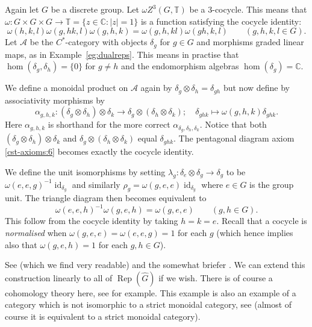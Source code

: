 \documentclass[a4paper,11pt]{article}
\theoremstyle{plain}
\theoremstyle{remark}
\newenvironment{example}
  {\pushQED{\qed}\renewcommand{\qedsymbol}{$\triangle$}\examplex}
  {\popQED\endexamplex}
\newcommand{\mc}[1]{\mathcal{#1}}
\newcommand{\id}{\operatorname{id}}
\newcommand{\Rep}{\operatorname{Rep}}
\begin{document}
\begin{example}
Again let $G$ be a discrete group.  Let $\omega Z^3(G, \mathbb T)$ be a $3$-cocycle.  This means that $\omega \colon G\times G\times G \to \mathbb T = \{ z\in\mathbb C : |z|=1\}$ is a function satisfying the cocycle identity:
\[ \omega(h, k, l) \omega(g, hk, l) \omega(g, h, k) = \omega(g, h, kl) \omega(gh, k, l) \qquad (g,h,k,l\in G). \]
Let $\mc A$ be the $C^*$-category with objects $\delta_g$ for $g\in G$ and morphisms graded linear maps, as in Example~\ref{eg:dualreps}.  This means in practise that $\hom(\delta_g, \delta_h) = \{0\}$ for $g\not=h$ and the endomorphism algebras $\hom(\delta_g) = \mathbb C$.

We define a monoidal product on $\mc A$ again by $\delta_g \otimes \delta_h = \delta_{gh}$ but now define by associativity morphisms by
\[ \alpha_{g,h,k} \colon (\delta_g\otimes\delta_h)\otimes\delta_k \to \delta_g\otimes(\delta_h\otimes\delta_k); \quad
\delta_{ghk} \mapsto \omega(g,h,k) \delta_{ghk}. \]
Here $\alpha_{g,h,k}$ is shorthand for the more correct $\alpha_{\delta_g, \delta_h, \delta_k}$.  Notice that both $(\delta_g\otimes\delta_h)\otimes\delta_k$ and $\delta_g\otimes(\delta_h\otimes\delta_k)$ equal $\delta_{ghk}$.  The pentagonal diagram axiom \ref{cst-axioms:6} becomes exactly the cocycle identity.

We define the unit isomorphisms by setting $\lambda_g \colon \delta_e \otimes \delta_g \to \delta_g$ to be $\omega(e,e,g)^{-1} \id_{\delta_g}$ and similarly $\rho_g = \omega(g,e,e) \id_{\delta_g}$ where $e\in G$ is the group unit.  The triangle diagram then becomes equivalent to
\[ \omega(e,e,h)^{-1} \omega(g,e,h) = \omega(g,e,e) \qquad (g,h\in G). \]
This follow from the cocycle identity by taking $h=k=e$.  Recall that a cocycle is \emph{normalised} when $\omega(g,e,e) = \omega(e,e,g) = 1$ for each $g$ (which hence implies also that $\omega(g,e,h)=1$ for each $g,h\in G$).

See \cite[Example~2.3.8]{EGNO_TensorCategories} (which we find very readable) and the somewhat briefer \cite[Example~2.1.2]{NT_CQGsBook}.  We can extend this construction linearly to all of $\Rep(\hat G)$ if we wish.  There is of course a cohomology theory here, see \cite[Section~2.6]{EGNO_TensorCategories} for example.  This example is also an example of a category which is not isomorphic to a strict monoidal category, see \cite[Remark~2.8.6]{EGNO_TensorCategories} (almost of course it is equivalent to a strict monoidal category).
\end{example}
\end{document}
